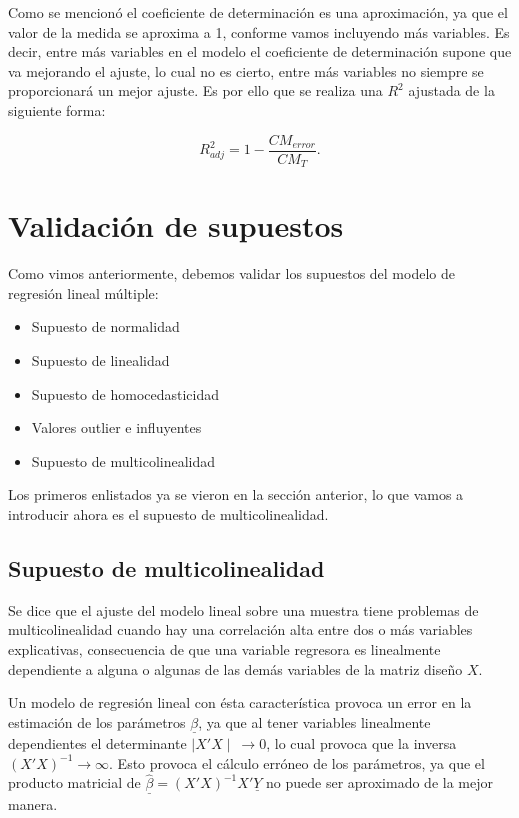 \documentclass[a4paper,oneside,openany]{book}
\begin{document}
Como se mencionó el coeficiente de determinación es una aproximación, ya
que el valor de la medida se aproxima a 1, conforme vamos incluyendo más
variables. Es decir, entre más variables en el modelo el coeficiente de
determinación supone que va mejorando el ajuste, lo cual no es cierto,
entre más variables no siempre se proporcionará un mejor ajuste. Es por
ello que se realiza una \(R^2\) ajustada de la siguiente forma:

\[R^2_{adj}=1- \frac{CM_{error}}{CM_{T}}.\]

\section{Validación de supuestos}\label{validaciuxf3n-de-supuestos-1}

Como vimos anteriormente, debemos validar los supuestos del modelo de
regresión lineal múltiple:

\begin{itemize}
\item
  Supuesto de normalidad
\item
  Supuesto de linealidad
\item
  Supuesto de homocedasticidad
\item
  Valores outlier e influyentes
\item
  Supuesto de multicolinealidad
\end{itemize}

Los primeros enlistados ya se vieron en la sección anterior, lo que
vamos a introducir ahora es el supuesto de multicolinealidad.

\subsection{Supuesto de
multicolinealidad}\label{supuesto-de-multicolinealidad}

Se dice que el ajuste del modelo lineal sobre una muestra tiene
problemas de multicolinealidad cuando hay una correlación alta entre dos
o más variables explicativas, consecuencia de que una variable regresora
es linealmente dependiente a alguna o algunas de las demás variables de
la matriz diseño \(X\).

Un modelo de regresión lineal con ésta característica provoca un error
en la estimación de los parámetros \(\underline{\beta}\), ya que al
tener variables linealmente dependientes el determinante
\(\mid X'X \mid \ \rightarrow 0\), lo cual provoca que la inversa
\((X'X)^{-1} \rightarrow \infty\). Esto provoca el cálculo erróneo de
los parámetros, ya que el producto matricial de
\(\underline{\hat{\beta}}=(X'X)^{-1}X'\underline{Y}\) no puede ser
aproximado de la mejor manera.
\end{document}

